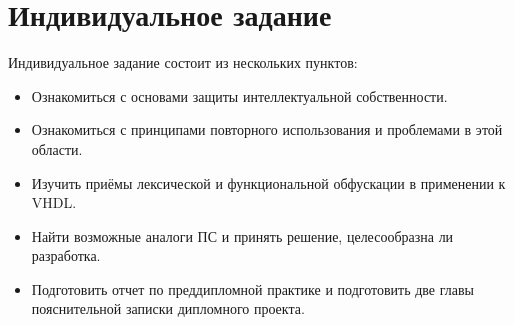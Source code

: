 \section{Индивидуальное задание}
\label{sec:practice:individual_task}
Индивидуальное задание состоит из нескольких пунктов:
\begin{itemize}
  \item Ознакомиться с основами защиты интеллектуальной собственности.
  \item Ознакомиться с принципами повторного использования и проблемами в этой области.
  \item Изучить приёмы лексической и функциональной обфускации в применении к VHDL.
  \item Найти возможные аналоги ПС и принять решение, целесообразна ли разработка.
  \item Подготовить отчет по преддипломной практике и подготовить две главы пояснительной записки дипломного проекта.
\end{itemize}
